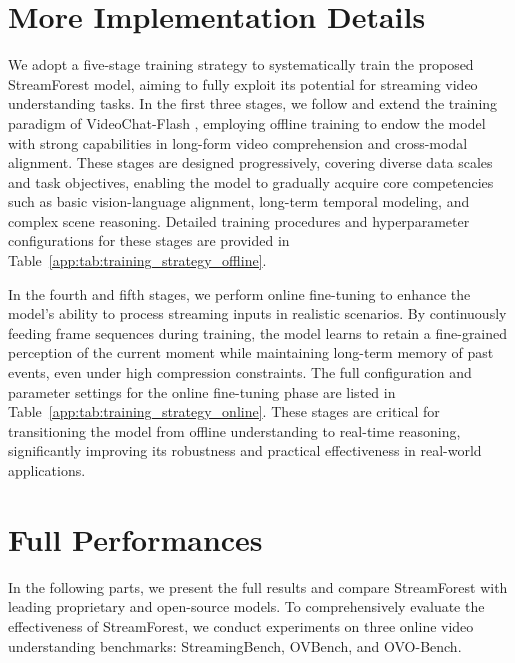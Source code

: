 \section{More Implementation Details}
\label{app:sec:More_Implementation_Details}





We adopt a five-stage training strategy to systematically train the proposed StreamForest model, aiming to fully exploit its potential for streaming video understanding tasks. In the first three stages, we follow and extend the training paradigm of VideoChat-Flash \cite{li2024videochatflash}, employing offline training to endow the model with strong capabilities in long-form video comprehension and cross-modal alignment. These stages are designed progressively, covering diverse data scales and task objectives, enabling the model to gradually acquire core competencies such as basic vision-language alignment, long-term temporal modeling, and complex scene reasoning. Detailed training procedures and hyperparameter configurations for these stages are provided in Table~\ref{app:tab:training_strategy_offline}.




In the fourth and fifth stages, we perform online fine-tuning to enhance the model’s ability to process streaming inputs in realistic scenarios. By continuously feeding frame sequences during training, the model learns to retain a fine-grained perception of the current moment while maintaining long-term memory of past events, even under high compression constraints. The full configuration and parameter settings for the online fine-tuning phase are listed in Table~\ref{app:tab:training_strategy_online}. These stages are critical for transitioning the model from offline understanding to real-time reasoning, significantly improving its robustness and practical effectiveness in real-world applications.











\section{Full Performances}
\label{app:sec:Full_Performances}
In the following parts, we present the full results and compare StreamForest with leading proprietary and open-source models. To comprehensively evaluate the effectiveness of StreamForest, we conduct experiments on three online video understanding benchmarks: StreamingBench, OVBench, and OVO-Bench.

